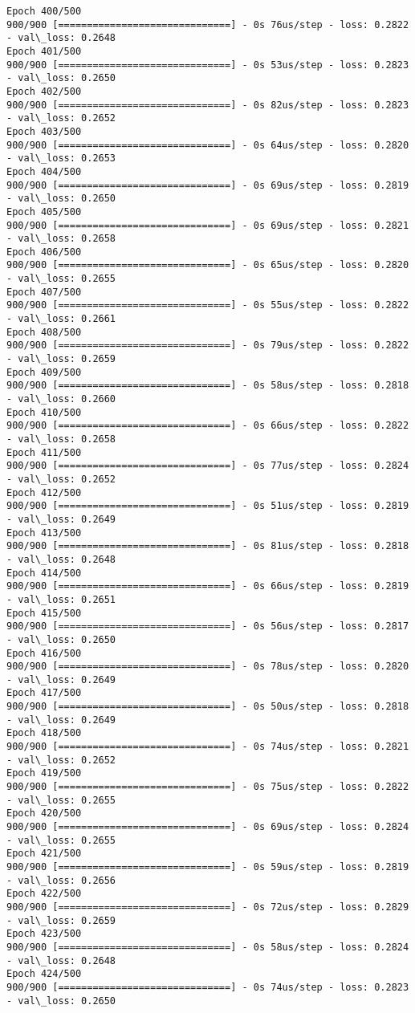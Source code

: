 \documentclass[11pt]{article}
\begin{document}
\begin{Verbatim}[commandchars=\\\{\}]
Epoch 400/500
900/900 [==============================] - 0s 76us/step - loss: 0.2822 - val\_loss: 0.2648
Epoch 401/500
900/900 [==============================] - 0s 53us/step - loss: 0.2823 - val\_loss: 0.2650
Epoch 402/500
900/900 [==============================] - 0s 82us/step - loss: 0.2823 - val\_loss: 0.2652
Epoch 403/500
900/900 [==============================] - 0s 64us/step - loss: 0.2820 - val\_loss: 0.2653
Epoch 404/500
900/900 [==============================] - 0s 69us/step - loss: 0.2819 - val\_loss: 0.2650
Epoch 405/500
900/900 [==============================] - 0s 69us/step - loss: 0.2821 - val\_loss: 0.2658
Epoch 406/500
900/900 [==============================] - 0s 65us/step - loss: 0.2820 - val\_loss: 0.2655
Epoch 407/500
900/900 [==============================] - 0s 55us/step - loss: 0.2822 - val\_loss: 0.2661
Epoch 408/500
900/900 [==============================] - 0s 79us/step - loss: 0.2822 - val\_loss: 0.2659
Epoch 409/500
900/900 [==============================] - 0s 58us/step - loss: 0.2818 - val\_loss: 0.2660
Epoch 410/500
900/900 [==============================] - 0s 66us/step - loss: 0.2822 - val\_loss: 0.2658
Epoch 411/500
900/900 [==============================] - 0s 77us/step - loss: 0.2824 - val\_loss: 0.2652
Epoch 412/500
900/900 [==============================] - 0s 51us/step - loss: 0.2819 - val\_loss: 0.2649
Epoch 413/500
900/900 [==============================] - 0s 81us/step - loss: 0.2818 - val\_loss: 0.2648
Epoch 414/500
900/900 [==============================] - 0s 66us/step - loss: 0.2819 - val\_loss: 0.2651
Epoch 415/500
900/900 [==============================] - 0s 56us/step - loss: 0.2817 - val\_loss: 0.2650
Epoch 416/500
900/900 [==============================] - 0s 78us/step - loss: 0.2820 - val\_loss: 0.2649
Epoch 417/500
900/900 [==============================] - 0s 50us/step - loss: 0.2818 - val\_loss: 0.2649
Epoch 418/500
900/900 [==============================] - 0s 74us/step - loss: 0.2821 - val\_loss: 0.2652
Epoch 419/500
900/900 [==============================] - 0s 75us/step - loss: 0.2822 - val\_loss: 0.2655
Epoch 420/500
900/900 [==============================] - 0s 69us/step - loss: 0.2824 - val\_loss: 0.2655
Epoch 421/500
900/900 [==============================] - 0s 59us/step - loss: 0.2819 - val\_loss: 0.2656
Epoch 422/500
900/900 [==============================] - 0s 72us/step - loss: 0.2829 - val\_loss: 0.2659
Epoch 423/500
900/900 [==============================] - 0s 58us/step - loss: 0.2824 - val\_loss: 0.2648
Epoch 424/500
900/900 [==============================] - 0s 74us/step - loss: 0.2823 - val\_loss: 0.2650

\end{Verbatim}
\end{document}
